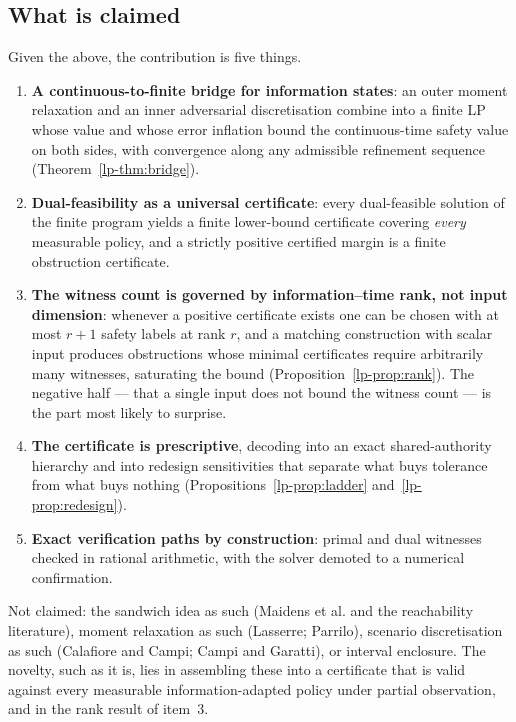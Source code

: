 \documentclass[10pt,twocolumn]{article}
\theoremstyle{plain}
\theoremstyle{definition}
\theoremstyle{remark}
\begin{document}
\subsection{What is claimed}

Given the above, the contribution is five things.

\begin{enumerate}
\item \textbf{A continuous-to-finite bridge for information states}: an outer moment
  relaxation and an inner adversarial discretisation combine into a finite LP whose value and
  whose error inflation bound the continuous-time safety value on both sides, with
  convergence along any admissible refinement sequence (Theorem~\ref{lp-thm:bridge}).
\item \textbf{Dual-feasibility as a universal certificate}: every dual-feasible solution of
  the finite program yields a finite lower-bound certificate covering \emph{every} measurable
  policy, and a strictly positive certified margin is a finite obstruction certificate.
\item \textbf{The witness count is governed by information--time rank, not input dimension}:
  whenever a positive certificate exists one can be chosen with at most $r+1$ safety labels
  at rank $r$, and a matching construction with scalar input produces obstructions whose
  minimal certificates require arbitrarily many witnesses, saturating the bound
  (Proposition~\ref{lp-prop:rank}). The negative half — that a single input does not bound the
  witness count — is the part most likely to surprise.
\item \textbf{The certificate is prescriptive}, decoding into an exact shared-authority
  hierarchy and into redesign sensitivities that separate what buys tolerance from what buys
  nothing (Propositions~\ref{lp-prop:ladder} and~\ref{lp-prop:redesign}).
\item \textbf{Exact verification paths by construction}: primal and dual witnesses checked in
  rational arithmetic, with the solver demoted to a numerical confirmation.
\end{enumerate}

\noindent Not claimed: the sandwich idea as such (Maidens et al. and the reachability
literature), moment relaxation as such (Lasserre; Parrilo), scenario discretisation as such
(Calafiore and Campi; Campi and Garatti), or interval enclosure. The novelty, such as it is,
lies in assembling these into a certificate that is valid against every measurable
information-adapted policy under partial observation, and in the rank result of item~3.
\end{document}
